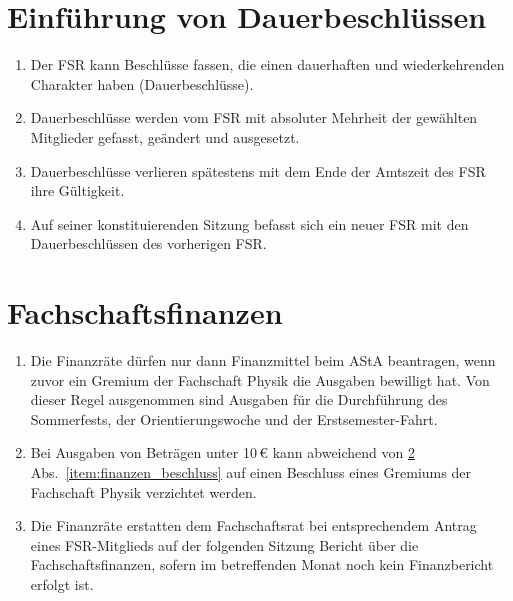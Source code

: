 \section{Einführung von Dauerbeschlüssen}
\begin{enumerate}
\item Der FSR kann Beschlüsse fassen, die einen dauerhaften und wiederkehrenden Charakter haben (Dauerbeschlüsse). 
\item Dauerbeschlüsse werden vom FSR mit absoluter Mehrheit der gewählten Mitglieder gefasst, geändert und ausgesetzt. 
\item Dauerbeschlüsse verlieren spätestens mit dem Ende der Amtszeit des FSR ihre Gültigkeit. 
\item Auf seiner konstituierenden Sitzung befasst sich ein neuer FSR mit den Dauerbeschlüssen des vorherigen FSR.
\end{enumerate}

\section{Fachschaftsfinanzen}
\label{sec:finanzen}
\begin{enumerate}
	\item \label{item:finanzen_beschluss}
Die Finanzräte dürfen nur dann Finanzmittel beim AStA beantragen, wenn zuvor ein Gremium der Fachschaft Physik die Ausgaben bewilligt hat.
	Von dieser Regel ausgenommen sind Ausgaben für die Durchführung des Sommerfests, der Orientierungswoche und der Erstsemester-Fahrt.
	\item Bei Ausgaben von Beträgen unter 10\,€ kann abweichend von \ref{sec:finanzen} Abs.~\ref{item:finanzen_beschluss} auf einen Beschluss eines Gremiums der Fachschaft Physik verzichtet werden.
	\item Die Finanzräte erstatten dem Fachschaftsrat bei entsprechendem Antrag eines FSR-Mitglieds auf der folgenden Sitzung Bericht über die Fachschaftsfinanzen, sofern im betreffenden Monat noch kein Finanzbericht erfolgt ist.
\end{enumerate}

